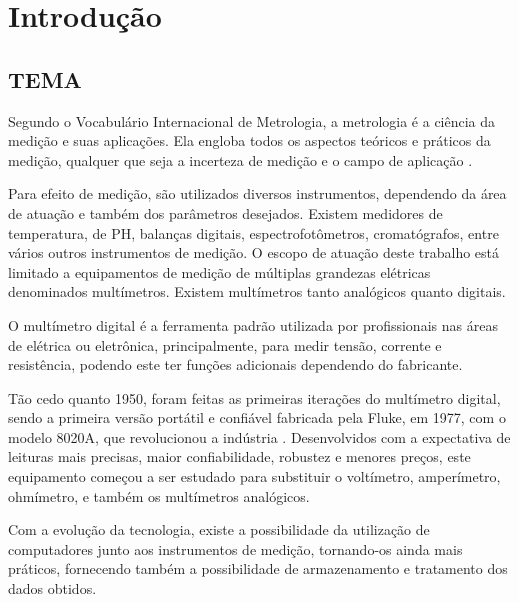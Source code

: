 
\chapter{Introdução}\label{cap:introducao}

\section{TEMA}\label{sec:tema}
Segundo o Vocabulário Internacional de Metrologia, a metrologia é a ciência da medição e suas aplicações. Ela engloba todos os aspectos teóricos e práticos da medição, qualquer que seja a incerteza de medição e o campo de aplicação \cite{linck}.

Para efeito de medição, são utilizados diversos instrumentos, dependendo da área de atuação e também dos parâmetros desejados. Existem medidores de temperatura, de PH, balanças digitais, espectrofotômetros, cromatógrafos, entre vários outros instrumentos de medição. O escopo de atuação deste trabalho está limitado a equipamentos de medição de múltiplas grandezas elétricas denominados multímetros. Existem multímetros tanto analógicos quanto digitais.

O multímetro digital é a ferramenta padrão utilizada por profissionais nas áreas de elétrica ou eletrônica, principalmente, para medir tensão, corrente e resistência, podendo este ter funções adicionais dependendo do fabricante.

Tão cedo quanto 1950, foram feitas as primeiras iterações do multímetro digital, sendo a primeira versão portátil e confiável fabricada pela Fluke, em 1977, com o modelo 8020A, que revolucionou a indústria \citep{DMMHistory}. Desenvolvidos com a expectativa de leituras mais precisas, maior confiabilidade, robustez e menores preços, este equipamento começou a ser estudado para substituir o voltímetro, amperímetro, ohmímetro, e também os multímetros analógicos.

Com a evolução da tecnologia, existe a possibilidade da utilização de computadores junto aos instrumentos de medição, tornando-os ainda mais práticos, fornecendo também a possibilidade de armazenamento e tratamento dos dados obtidos.


